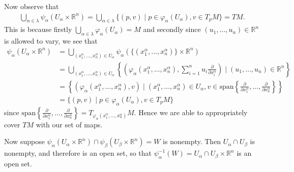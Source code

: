 \documentclass[12pt,letterpaper,boxed]{math_hw_pset}
\newcommand{\rr}{\mathbb{R}}
\renewcommand{\phi}{\varphi}
\begin{document}
\begin{solution}
    Now observe that 
    \begin{align*}
        \bigcup_{\alpha \in \lambda}\psi_\alpha\left( U_\alpha\times\rr^n \right)
        = 
        \bigcup_{\alpha \in \lambda}\{ (p, v) \mid p \in \phi_\alpha(U_\alpha), v \in T_pM \}
        = 
        TM.
    \end{align*}
    This is because firstly $\bigcup_{\alpha \in \lambda}\phi_\alpha(U_\alpha) = M$
    and secondly
    since $(u_1, \dots, u_n) \in \rr^n$ is allowed to vary, 
    we see that 
    \begin{align*}
        \psi_\alpha(U_\alpha \times \rr^n) &= \bigcup_{(x_1^\alpha, \dots, x_n^\alpha) \in U_\alpha}\psi_\alpha( \{(x_1^\alpha, \dots, x_n^\alpha)\} \times \rr^n)\\
        &= \bigcup_{(x_1^\alpha, \dots, x_n^\alpha) \in U_\alpha}
        \left\{\left(\phi_\alpha(x_1^\alpha, \dots, x_n^\alpha), \sum_{i=1}^{n}u_i\frac{\partial}{\partial x_i^\alpha}\right)
        \mid (u_1, \dots, u_n) \in \rr^n\right\}\\
        &= \left\{\left(\phi_\alpha(x_1^\alpha, \dots, x_n^\alpha), 
        v
        \right) \mid (x_1^\alpha, \dots, x_n^\alpha) \in U_\alpha, v \in \text{span}\left\{ \frac{\partial}{\partial x_1^\alpha}, \dots, \frac{\partial}{\partial x_n^\alpha} \right\}\right\}\\
        &= \{ (p, v) \mid p \in \phi_\alpha(U_\alpha), v \in T_pM \}
    \end{align*}
    since $\displaystyle \text{span}\left\{ \frac{\partial}{\partial x_1^\alpha}, \dots, \frac{\partial}{\partial x_n^\alpha} \right\} = T_{\phi_\alpha(x_1^\alpha, \dots, x_n^\alpha)}M$. 
    Hence we are able to appropriately cover $TM$ with our set of maps.

    Now suppose $\psi_\alpha(U_\alpha \times  \rr^n) \cap \psi_\beta(U_\beta \times \rr^n) = W$ 
    is nonempty. Then $U_\alpha \cap U_\beta$ is nonempty, and therefore is an open set,
    so that $\psi_\alpha^{-1}(W) = U_\alpha\cap U_\beta \times \rr^n$ is an open set. 


\end{solution}
\end{document}
